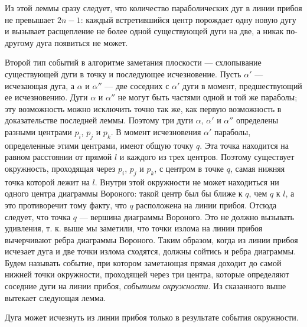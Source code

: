 Из  этой  леммы  сразу  следует,  что  количество  параболических  дуг  в  линии  прибоя  не  превышает $2n-1$:  каждый  встретившийся  центр  порождает  одну  новую дугу  и  вызывает  расщепление  не  более  одной  существующей  дуги  на  две,  а  никак по-другому  дуга  появиться  не  может.

Второй  тип  событий  в  алгоритме  заметания  плоскости  --- схлопывание  существующей  дуги  в  точку  и  последующее  исчезновение.
Пусть  $\alpha'$  --- исчезающая  дуга,  а  $\alpha$ и $\alpha''$ --- две  соседних  с  $\alpha'$  дуги  в  момент,  предшествующий ее  исчезновению.
Дуги  $\alpha$ и $\alpha''$  не  могут  быть  частями  одной  и  той  же  параболы; эту  возможность  можно  исключить  точно  так  же,  как  первую  возможность  в  доказательстве  последней леммы.
Поэтому  три  дуги  $\alpha$,  $\alpha'$ и $\alpha''$  определены  разными  центрами  $p_i$, $p_j$ и $p_k$.
В  момент  исчезновения  $\alpha'$  параболы,  определенные  этими  центрами,  имеют общую  точку  $q$.
Эта  точка  находится  на  равном  расстоянии  от  прямой $l$ и  каждого из  трех  центров.
Поэтому  существует  окружность,  проходящая  через  $p_i$, $p_j$ и $p_k$,  с центром  в  точке  $q$,  самая  нижняя  точка  которой  лежит  на  $l$.
Внутри  этой  окружности  не  может  находиться  ни  одного  центра  диаграммы  Вороного:  такой центр был  бы  ближе  к  $q$,  чем  $q$  к  $l$, а  это  противоречит  тому  факту,  что  $q$  расположена на  линии  прибоя.
Отсюда  следует,  что  точка  $q$ --- вершина  диаграммы  Вороного. 
Это  не  должно  вызывать  удивления,  т.  к.  выше  мы  заметили,  что  точки  излома  на линии  прибоя  вычерчивают  ребра  диаграммы  Вороного.
Таким  образом,  когда  из линии  прибоя  исчезает  дуга  и  две  точки  излома  сходятся,  должны  сойтись  и  ребра 
диаграммы.
Будем  называть  событие,  при  котором  заметающая  прямая  доходит  до самой  нижней  точки  окружности,  проходящей  через  три  центра,  которые  определяют  соседние  дуги  на  линии  прибоя,  \textit{событием  окружности}.
Из  сказанного  выше вытекает  следующая  лемма.

\begin{lemma}
	Дуга  может  исчезнуть  из  линии  прибоя  только  в  результате  события  окружности.
\end{lemma}

